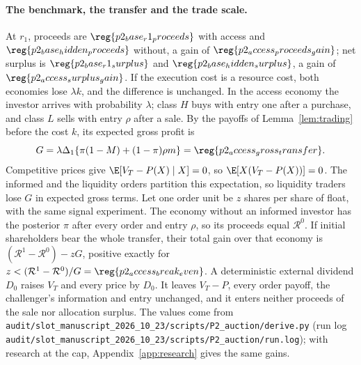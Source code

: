 \paragraph{The benchmark, the transfer and the trade scale.}
At \(r_1\), proceeds are \(\reg{p2_base_r1_proceeds}\) with access and \(\reg{p2_base_hidden_proceeds}\) without, a gain of
\(\reg{p2_access_proceeds_gain}\); net surplus is \(\reg{p2_base_r1_surplus}\) and \(\reg{p2_base_hidden_surplus}\), a gain of
\(\reg{p2_access_surplus_gain}\). If the execution cost is a resource cost, both economies lose \(\lambda k\), and the
difference is unchanged. In the access economy the investor arrives with probability \(\lambda\); class \(H\) buys
with entry one after a purchase, and class \(L\) sells with entry \(\rho\) after a sale. By the payoffs of
Lemma~\ref{lem:trading} before the cost \(k\), its expected gross profit is
\[
G=\lambda\Delta_1\{\pi(1-M)+(1-\pi)\rho m\}=\reg{p2_access_gross_transfer}.
\]
Competitive prices give \(\E[V_T-P(X)\mid X]=0\), so \(\E[X(V_T-P(X))]=0\). The informed and the liquidity orders
partition this expectation, so liquidity traders lose \(G\) in expected gross terms. Let one order unit be \(z\)
shares per share of float, with the same signal experiment. The economy without an informed investor has the
posterior \(\pi\) after every order and entry \(\rho\), so its proceeds equal \(\mathcal R^0\). If initial shareholders
bear the whole transfer, their total gain over that economy is \((\mathcal R^1-\mathcal R^0)-zG\), positive exactly
for \(z<(\mathcal R^1-\mathcal R^0)/G=\reg{p2_access_break_even}\). A deterministic external dividend \(D_0\) raises
\(V_T\) and every price by \(D_0\). It leaves \(V_T-P\), every order payoff, the challenger's information and entry
unchanged, and it enters neither proceeds of the sale nor allocation surplus. The values come from
\nolinkurl{audit/slot_manuscript_2026_10_23/scripts/P2_auction/derive.py} (run log
\nolinkurl{audit/slot_manuscript_2026_10_23/scripts/P2_auction/run.log}); with research at the cap, Appendix~\ref{app:research}
gives the same gains.

